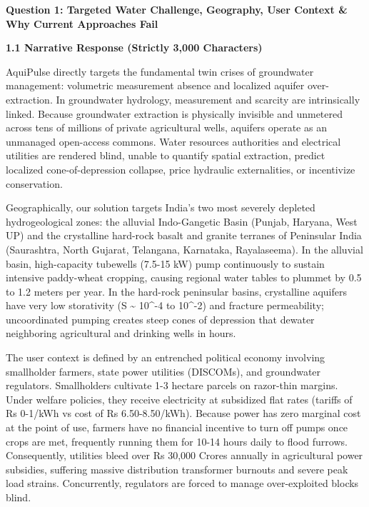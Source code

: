 \documentclass[10pt,a4paper]{article}
\begin{document}
\vspace{-0.6em}
\noindent\makebox[\linewidth]{\rule{\textwidth}{0.6pt}}

\vspace{0.3em}
{\large \textbf{\color{primary}Question 1: Targeted Water Challenge, Geography, User Context \& Why Current Approaches Fail}}
\vspace{0.1em}

{\small \textbf{\color{secondary}1.1 Narrative Response (Strictly 3,000 Characters)}}

AquiPulse directly targets the fundamental twin crises of groundwater management: volumetric measurement absence and localized aquifer over-extraction. In groundwater hydrology, measurement and scarcity are intrinsically linked. Because groundwater extraction is physically invisible and unmetered across tens of millions of private agricultural wells, aquifers operate as an unmanaged open-access commons. Water resources authorities and electrical utilities are rendered blind, unable to quantify spatial extraction, predict localized cone-of-depression collapse, price hydraulic externalities, or incentivize conservation.

Geographically, our solution targets India's two most severely depleted hydrogeological zones: the alluvial Indo-Gangetic Basin (Punjab, Haryana, West UP) and the crystalline hard-rock basalt and granite terranes of Peninsular India (Saurashtra, North Gujarat, Telangana, Karnataka, Rayalaseema). In the alluvial basin, high-capacity tubewells (7.5-15 kW) pump continuously to sustain intensive paddy-wheat cropping, causing regional water tables to plummet by 0.5 to 1.2 meters per year. In the hard-rock peninsular basins, crystalline aquifers have very low storativity (S \~{} 10\^{}-4 to 10\^{}-2) and fracture permeability; uncoordinated pumping creates steep cones of depression that dewater neighboring agricultural and drinking wells in hours.

The user context is defined by an entrenched political economy involving smallholder farmers, state power utilities (DISCOMs), and groundwater regulators. Smallholders cultivate 1-3 hectare parcels on razor-thin margins. Under welfare policies, they receive electricity at subsidized flat rates (tariffs of Rs 0-1/kWh vs cost of Rs 6.50-8.50/kWh). Because power has zero marginal cost at the point of use, farmers have no financial incentive to turn off pumps once crops are met, frequently running them for 10-14 hours daily to flood furrows. Consequently, utilities bleed over Rs 30,000 Crores annually in agricultural power subsidies, suffering massive distribution transformer burnouts and severe peak load strains. Concurrently, regulators are forced to manage over-exploited blocks blind.
\end{document}
